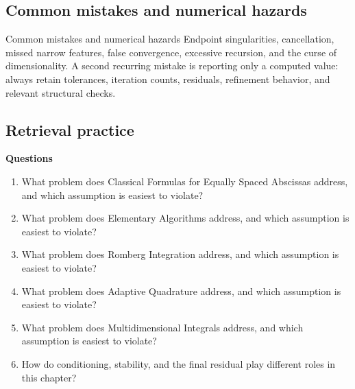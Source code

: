 \documentclass[10pt,letterpaper]{article}
\begin{document}
\subsection*{Common mistakes and numerical hazards}
\begin{warnbox}{Common mistakes and numerical hazards}
Endpoint singularities, cancellation, missed narrow features, false convergence, excessive recursion, and the curse of dimensionality.  A second recurring mistake is reporting only a computed value: always retain tolerances, iteration counts, residuals, refinement behavior, and relevant structural checks.
\end{warnbox}

\subsection*{Retrieval practice}
\textbf{Questions}
\begin{enumerate}
\item What problem does Classical Formulas for Equally Spaced Abscissas address, and which assumption is easiest to violate?
\item What problem does Elementary Algorithms address, and which assumption is easiest to violate?
\item What problem does Romberg Integration address, and which assumption is easiest to violate?
\item What problem does Adaptive Quadrature address, and which assumption is easiest to violate?
\item What problem does Multidimensional Integrals address, and which assumption is easiest to violate?
\item How do conditioning, stability, and the final residual play different roles in this chapter?
\end{enumerate}
\end{document}
